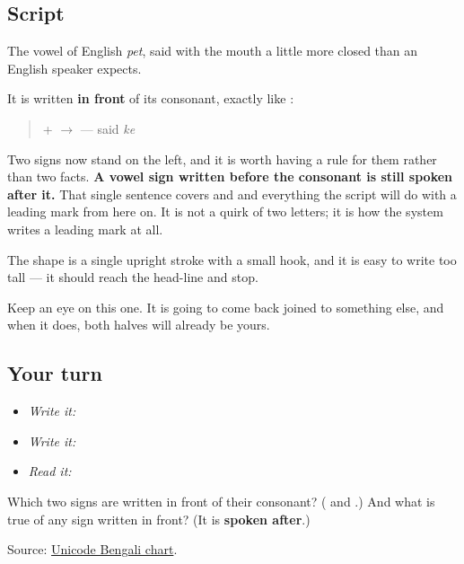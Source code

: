 \subsection*{Script}
\begin{quote}
\end{quote}

The vowel of English \emph{pet}, said with the mouth a little more closed than an English speaker expects.

It is written \textbf{in front} of its consonant, exactly like \textbf{}:

\begin{quote}
\textbf{} + \textbf{} $\to$ \textbf{} — said \emph{ke}
\end{quote}

Two signs now stand on the left, and it is worth having a rule for them rather than two facts. \textbf{A vowel sign written before the consonant is still spoken after it.} That single sentence covers \textbf{} and \textbf{} and everything the script will do with a leading mark from here on. It is not a quirk of two letters; it is how the system writes a leading mark at all.

The shape is a single upright stroke with a small hook, and it is easy to write too tall — it should reach the head-line and stop.

Keep an eye on this one. It is going to come back joined to something else, and when it does, both halves will already be yours.

\subsection*{Your turn}
\begin{itemize}
\raggedright
  \item \emph{Write it:} 
  \item \emph{Write it:} 
  \item \emph{Read it:} 
\end{itemize}

\begin{tcolorbox}[breakable,colback=teal!4,colframe=teal!35!black,title={Before you move on}]
Which two signs are written in front of their consonant? (\textbf{} and \textbf{}.) And what is true of any sign written in front? (It is \textbf{spoken after}.)

Source: \href{https://www.unicode.org/charts/PDF/U0980.pdf}{Unicode Bengali chart}.
\end{tcolorbox}
